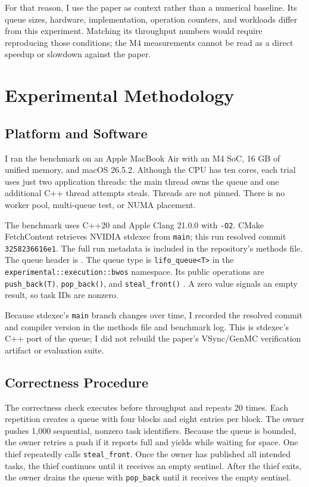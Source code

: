 \documentclass[conference]{IEEEtran}
\begin{document}
For that reason, I use the paper as context rather than a numerical baseline. Its queue sizes, hardware, implementation, operation counters, and workloads differ from this experiment. Matching its throughput numbers would require reproducing those conditions; the M4 measurements cannot be read as a direct speedup or slowdown against the paper.

\section{Experimental Methodology}
\subsection{Platform and Software}
I ran the benchmark on an Apple MacBook Air with an M4 SoC, 16 GB of unified memory, and macOS 26.5.2. Although the CPU has ten cores, each trial uses just two application threads: the main thread owns the queue and one additional C++ thread attempts steals. Threads are not pinned. There is no worker pool, multi-queue test, or NUMA placement.

The benchmark uses C++20 and Apple Clang 21.0.0 with \texttt{-O2}. CMake FetchContent retrieves NVIDIA stdexec from \texttt{main}; this run resolved commit \texttt{3258236616e1}. The full run metadata is included in the repository's methods file. The queue header is . The queue type is \texttt{lifo\_queue<T>} in the \texttt{experimental::execution::bwos} namespace. Its public operations are \texttt{push\_back(T)}, \texttt{pop\_back()}, and \texttt{steal\_front()} \cite{nvidia_stdexec}. A zero value signals an empty result, so task IDs are nonzero.

Because stdexec's \texttt{main} branch changes over time, I recorded the resolved commit and compiler version in the methods file and benchmark log. This is stdexec's C++ port of the queue; I did not rebuild the paper's VSync/GenMC verification artifact or evaluation suite.

\subsection{Correctness Procedure}
The correctness check executes before throughput and repeats 20 times. Each repetition creates a queue with four blocks and eight entries per block. The owner pushes 1,000 sequential, nonzero task identifiers. Because the queue is bounded, the owner retries a push if it reports full and yields while waiting for space. One thief repeatedly calls \texttt{steal\_front}. Once the owner has published all intended tasks, the thief continues until it receives an empty sentinel. After the thief exits, the owner drains the queue with \texttt{pop\_back} until it receives the empty sentinel.
\end{document}
